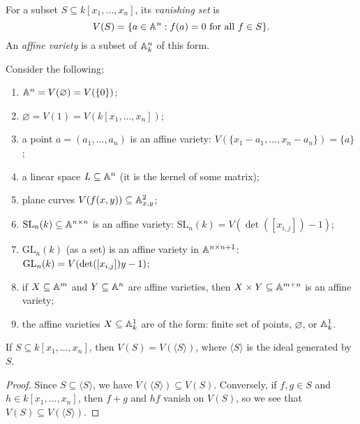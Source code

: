 \begin{definition}
  For a subset $S \subseteq k[x_1, \dots, x_n]$,
  its \emph{vanishing set} is
  \[
    V(S) = \{
      a \in \mathbb{A}^n : f(a) = 0 \text{ for all } f \in S
    \}.
  \]
  An \emph{affine variety} is a subset of
  $\mathbb{A}^n_k$ of this form.
\end{definition}

\begin{example}
  Consider the following:
  \begin{enumerate}
    \item $\mathbb{A}^n = V(\varnothing) = V(\{0\})$;
    \item $\varnothing = V(1) = V(k[x_1, \dots, x_n])$;
    \item a point $a = (a_1, \dots, a_n)$
      is an affine variety:
      $V(\{x_1 - a_1, \dots, x_n - a_n\}) = \{a\}$;
    \item a linear space
      $L \subseteq \mathbb{A}^n$ (it is the
      kernel of some matrix);
    \item plane curves $V(f(x, y)) \subseteq \mathbb{A}^2_{x, y}$;
    \item $\mathrm{SL}_n(k) \subseteq \mathbb{A}^{n \times n}$ is an
      affine variety: $\mathrm{SL}_n(k) = V(\det([x_{i, j}]) - 1)$;
    \item $\mathrm{GL}_n(k)$ (as a set) is an
      affine variety in $\mathbb{A}^{n \times n + 1}$:
      $\operatorname{GL}_n(k) = V(\det([x_{i, j}])y - 1)$;
    \item if $X \subseteq \mathbb{A}^m$ and
      $Y \subseteq \mathbb{A}^n$ are affine
      varieties, then $X \times Y \subseteq \mathbb{A}^{m + n}$
      is an affine variety;
    \item the affine varieties
      $X \subseteq \mathbb{A}^1_k$ are of
      the form: finite set of points,
      $\varnothing$, or $\mathbb{A}^1_k$.
  \end{enumerate}
\end{example}

\begin{prop}
  If $S \subseteq k[x_1, \dots, x_n]$, then
  $V(S) = V(\langle S \rangle)$, where
  $\langle S \rangle$ is the ideal generated
  by $S$.
\end{prop}

\begin{proof}
  Since $S \subseteq \langle S \rangle$,
  we have $V(\langle S \rangle) \subseteq V(S)$.
  Conversely, if $f, g \in S$ and
  $h \in k[x_1, \dots, x_n]$, then
  $f + g$ and $hf$ vanish on $V(S)$, so
  we see that
  $V(S) \subseteq V(\langle S \rangle)$.
\end{proof}

